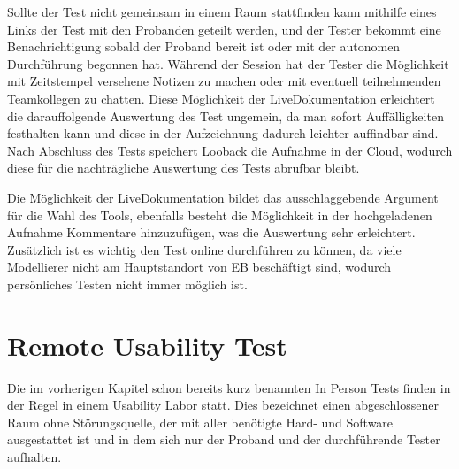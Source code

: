 Sollte der Test nicht gemeinsam in einem Raum stattfinden kann mithilfe eines Links der Test mit den Probanden geteilt werden, und der Tester bekommt eine Benachrichtigung sobald der Proband bereit ist oder mit der autonomen Durchführung begonnen hat.
Während der Session hat der Tester die Möglichkeit mit Zeitstempel versehene Notizen zu machen oder mit eventuell teilnehmenden Teamkollegen zu chatten.
Diese Möglichkeit der Live\-Dokumentation erleichtert die darauffolgende Auswertung des Test ungemein, da man sofort Auffälligkeiten festhalten kann und diese in der Aufzeichnung dadurch leichter auffindbar sind.
Nach Abschluss des Tests speichert Looback die Aufnahme in der Cloud, wodurch diese für die nachträgliche Auswertung des Tests abrufbar bleibt. \cite{.10.01.2020}

Die Möglichkeit der Live\-Dokumentation bildet das ausschlaggebende Argument für die Wahl des Tools, ebenfalls besteht die Möglichkeit in der hochgeladenen Aufnahme Kommentare hinzuzufügen, was die Auswertung sehr erleichtert.
Zusätzlich ist es wichtig den Test online durchführen zu können, da viele Modellierer nicht am Hauptstandort von EB beschäftigt sind, wodurch persönliches Testen nicht immer möglich ist.

\section{Remote Usability Test}
Die im vorherigen Kapitel schon bereits kurz benannten In Person Tests finden in der Regel in einem Usability Labor statt.
Dies bezeichnet einen abgeschlossener Raum ohne Störungsquelle, der mit aller benötigte Hard- und Software ausgestattet ist und in dem sich nur der Proband und der durchführende Tester aufhalten.

